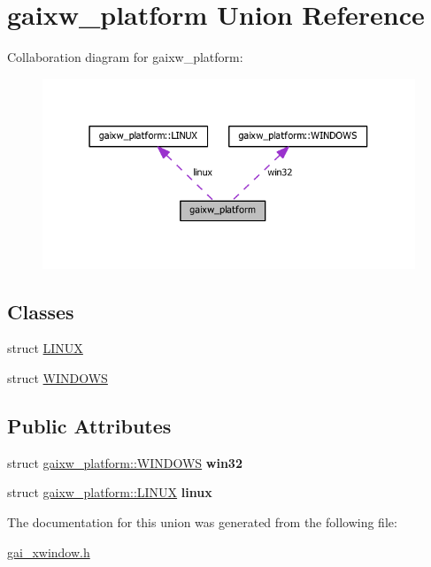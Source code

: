 \hypertarget{uniongaixw__platform}{}\section{gaixw\+\_\+platform Union Reference}
\label{uniongaixw__platform}


Collaboration diagram for gaixw\+\_\+platform\+:
\nopagebreak
\begin{figure}[H]
\begin{center}
\leavevmode
\includegraphics[width=316pt]{uniongaixw__platform__coll__graph}
\end{center}
\end{figure}
\subsection*{Classes}
\begin{DoxyCompactItemize}
\item 
struct \hyperlink{structgaixw__platform_1_1_l_i_n_u_x}{L\+I\+N\+UX}
\item 
struct \hyperlink{structgaixw__platform_1_1_w_i_n_d_o_w_s}{W\+I\+N\+D\+O\+WS}
\end{DoxyCompactItemize}
\subsection*{Public Attributes}
\begin{DoxyCompactItemize}
\item 
\mbox{\label{uniongaixw__platform_a414771117594e590710593e85c5feeab}} 
struct \hyperlink{structgaixw__platform_1_1_w_i_n_d_o_w_s}{gaixw\+\_\+platform\+::\+W\+I\+N\+D\+O\+WS} {\bfseries win32}
\item 
\mbox{\label{uniongaixw__platform_aeaf4e334f8114cb2ea5bb7bb4db932c7}} 
struct \hyperlink{structgaixw__platform_1_1_l_i_n_u_x}{gaixw\+\_\+platform\+::\+L\+I\+N\+UX} {\bfseries linux}
\end{DoxyCompactItemize}


The documentation for this union was generated from the following file\+:\begin{DoxyCompactItemize}
\item 
\hyperlink{gai__xwindow_8h}{gai\+\_\+xwindow.\+h}\end{DoxyCompactItemize}
